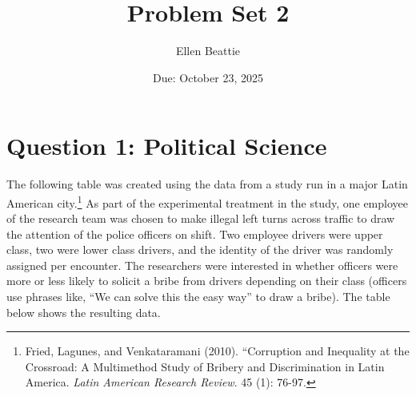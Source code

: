 \documentclass[12pt,letterpaper]{article}
\title{Problem Set 2}
\date{Due: October 23, 2025}
\author{Ellen Beattie}
\begin{document}
	\maketitle
	
	\vspace{.5cm}
	\section*{Question 1: Political Science}
		\vspace{.25cm}
	The following table was created using the data from a study run in a major Latin American city.\footnote{Fried, Lagunes, and Venkataramani (2010). ``Corruption and Inequality at the Crossroad: A Multimethod Study of Bribery and Discrimination in Latin America. \textit{Latin American Research Review}. 45 (1): 76-97.} As part of the experimental treatment in the study, one employee of the research team was chosen to make illegal left turns across traffic to draw the attention of the police officers on shift. Two employee drivers were upper class, two were lower class drivers, and the identity of the driver was randomly assigned per encounter. The researchers were interested in whether officers were more or less likely to solicit a bribe from drivers depending on their class (officers use phrases like, ``We can solve this the easy way'' to draw a bribe). The table below shows the resulting data. \\
\end{document}
